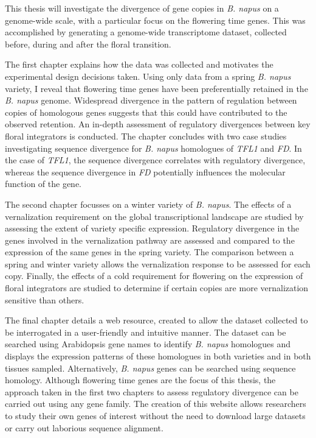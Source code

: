 \documentclass[12pt,]{book}
\begin{document}
This thesis will investigate the divergence of gene copies in \emph{B.
napus} on a genome-wide scale, with a particular focus on the flowering
time genes. This was accomplished by generating a genome-wide
transcriptome dataset, collected before, during and after the floral
transition.

The first chapter explains how the data was collected and motivates the
experimental design decisions taken. Using only data from a spring
\emph{B. napus} variety, I reveal that flowering time genes have been
preferentially retained in the \emph{B. napus} genome. Widespread
divergence in the pattern of regulation between copies of homologous
genes suggests that this could have contributed to the observed
retention. An in-depth assessment of regulatory divergences between key
floral integrators is conducted. The chapter concludes with two case
studies investigating sequence divergence for \emph{B. napus} homologues
of \emph{TFL1} and \emph{FD}. In the case of \emph{TFL1}, the sequence
divergence correlates with regulatory divergence, whereas the sequence
divergence in \emph{FD} potentially influences the molecular function of
the gene.

The second chapter focusses on a winter variety of \emph{B. napus}. The
effects of a vernalization requirement on the global transcriptional
landscape are studied by assessing the extent of variety specific
expression. Regulatory divergence in the genes involved in the
vernalization pathway are assessed and compared to the expression of the
same genes in the spring variety. The comparison between a spring and
winter variety allows the vernalization response to be assessed for each
copy. Finally, the effects of a cold requirement for flowering on the
expression of floral integrators are studied to determine if certain
copies are more vernalization sensitive than others.

The final chapter details a web resource, created to allow the dataset
collected to be interrogated in a user-friendly and intuitive manner.
The dataset can be searched using Arabidopsis gene names to identify
\emph{B. napus} homologues and displays the expression patterns of these
homologues in both varieties and in both tissues sampled. Alternatively,
\emph{B. napus} genes can be searched using sequence homology. Although
flowering time genes are the focus of this thesis, the approach taken in
the first two chapters to assess regulatory divergence can be carried
out using any gene family. The creation of this website allows
researchers to study their own genes of interest without the need to
download large datasets or carry out laborious sequence alignment.
\end{document}
